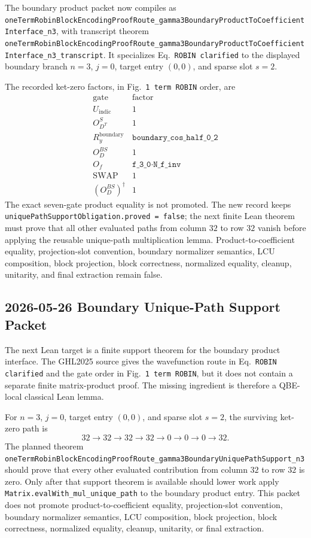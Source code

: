 The boundary product packet now compiles as
\texttt{oneTermRobinBlockEncodingProofRoute\_gamma3BoundaryProductToCoefficientInterface\_n3},
with transcript theorem
\texttt{oneTermRobinBlockEncodingProofRoute\_gamma3BoundaryProductToCoefficientInterface\_n3\_transcript}.
It specializes Eq.~\texttt{ROBIN clarified} to the displayed boundary branch
\(n=3\), \(j=0\), target entry \((0,0)\), and sparse slot \(s=2\).

The recorded ket-zero factors, in Fig.~\texttt{1 term ROBIN} order, are
\[
\begin{array}{c|c}
\text{gate} & \text{factor} \\
\hline
U_{\mathrm{indic}} & 1 \\
O_{D^T}^{S} & 1 \\
R_y^{\mathrm{boundary}} & \texttt{boundary\_cos\_half\_0\_2} \\
O_D^{BS} & 1 \\
O_f & \texttt{f\_3\_0}\cdot \texttt{N\_f\_inv} \\
\mathrm{SWAP} & 1 \\
(O_D^{BS})^\dagger & 1
\end{array}
\]
The exact seven-gate product equality is not promoted.  The new record keeps
\texttt{uniquePathSupportObligation.proved = false}; the next finite Lean
theorem must prove that all other evaluated paths from column \(32\) to row
\(32\) vanish before applying the reusable unique-path multiplication lemma.
Product-to-coefficient equality, projection-slot convention, boundary
normalizer semantics, LCU composition, block projection, block correctness,
normalized equality, cleanup, unitarity, and final extraction remain false.

\subsection{2026-05-26 Boundary Unique-Path Support Packet}

The next Lean target is a finite support theorem for the boundary product
interface.  The GHL2025 source gives the wavefunction route in
Eq.~\texttt{ROBIN clarified} and the gate order in Fig.~\texttt{1 term ROBIN},
but it does not contain a separate finite matrix-product proof.  The missing
ingredient is therefore a QBE-local classical Lean lemma.

For \(n=3\), \(j=0\), target entry \((0,0)\), and sparse slot \(s=2\), the
surviving ket-zero path is
\[
  32 \longrightarrow 32 \longrightarrow 32 \longrightarrow 32
  \longrightarrow 0 \longrightarrow 0 \longrightarrow 0
  \longrightarrow 32.
\]
The planned theorem
\texttt{oneTermRobinBlockEncodingProofRoute\_gamma3BoundaryUniquePathSupport\_n3}
should prove that every other evaluated contribution from column \(32\) to row
\(32\) is zero.  Only after that support theorem is available should lower work
apply \texttt{Matrix.evalWith\_mul\_unique\_path} to the boundary product
entry.  This packet does not promote product-to-coefficient equality,
projection-slot convention, boundary normalizer semantics, LCU composition,
block projection, block correctness, normalized equality, cleanup, unitarity,
or final extraction.

